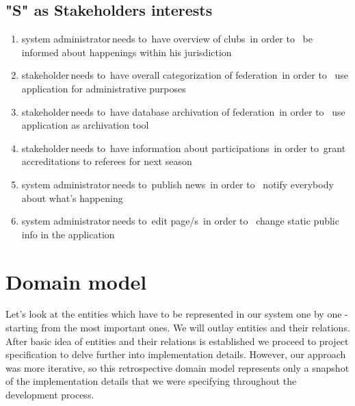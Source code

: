 \subsection*{"S" as Stakeholders interests}
\begin{enumerate}
  \item \lbrack system administrator\rbrack \,needs to\, \lbrack have overview of clubs\rbrack \, in order to \, \lbrack be informed about happenings within his jurisdiction\rbrack
  \item \lbrack stakeholder\rbrack \,needs to\, \lbrack have overall categorization of federation\rbrack \, in order to \, \lbrack use application for administrative purposes\rbrack
  \item \lbrack stakeholder\rbrack \,needs to\, \lbrack have database archivation of federation\rbrack \, in order to \, \lbrack use application as archivation tool\rbrack
  \item \lbrack stakeholder\rbrack \,needs to\, \lbrack have information about participations\rbrack \, in order to\, \lbrack grant accreditations to referees for next season\rbrack
  \item \lbrack system administrator\rbrack \,needs to\, \lbrack publish news\rbrack \, in order to \, \lbrack notify everybody about what's happening\rbrack
  \item \lbrack system administrator\rbrack \,needs to\, \lbrack edit page/s\rbrack \, in order to \, \lbrack change static public info in the application\rbrack
\end{enumerate}
\section{Domain model}
Let's look at the entities which have to be represented in our system one by one - starting from the most important ones. We will outlay entities and their relations. After basic idea of entities and their relations is established we proceed to project specification to delve further into implementation details. However, our approach was more iterative, so this retrospective domain model represents only a snapshot of the implementation details that we were specifying throughout the development process.
\par
